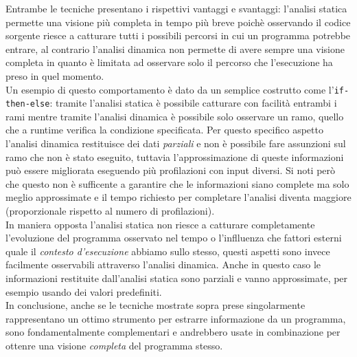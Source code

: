 Entrambe le tecniche presentano i rispettivi vantaggi e svantaggi: l'analisi statica permette una visione più completa in tempo più breve poichè osservando il codice sorgente riesce a catturare tutti i possibili percorsi in cui un programma potrebbe entrare, al contrario l'analisi dinamica non permette di avere sempre una visione completa in quanto è limitata ad osservare solo il percorso che l'esecuzione ha preso in quel momento.\\
Un esempio di questo comportamento è dato da un semplice costrutto come l'\texttt{if-then-else}: tramite l'analisi statica è possibile catturare con facilità entrambi i rami mentre tramite l'analisi dinamica è possibile solo osservare un ramo, quello che a runtime verifica la condizione specificata. Per questo specifico aspetto l'analisi dinamica restituisce dei dati \emph{parziali} e non è possibile fare assunzioni sul ramo che non è stato eseguito, tuttavia l'approssimazione di queste informazioni può essere migliorata eseguendo più profilazioni con input diversi. Si noti però che questo non è sufficente a garantire che le informazioni siano complete ma solo meglio approssimate e il tempo richiesto per completare l'analisi diventa maggiore (proporzionale rispetto al numero di profilazioni).\\
In maniera opposta l'analisi statica non riesce a catturare completamente l'evoluzione del programma osservato nel tempo o l'inflluenza che fattori esterni quale il \emph{contesto d'esecuzione} abbiamo sullo stesso, questi aspetti sono invece facilmente osservabili attraverso l'analisi dinamica. Anche in questo caso le informazioni restituite dall'analisi statica sono parziali e vanno approssimate, per esempio usando dei valori predefiniti.\bigskip \\
In conclusione, anche se le tecniche mostrate sopra prese singolarmente rappresentano un ottimo strumento per estrarre informazione da un programma, sono fondamentalmente complementari e andrebbero usate in combinazione per ottenre una visione \emph{completa} del programma stesso.


